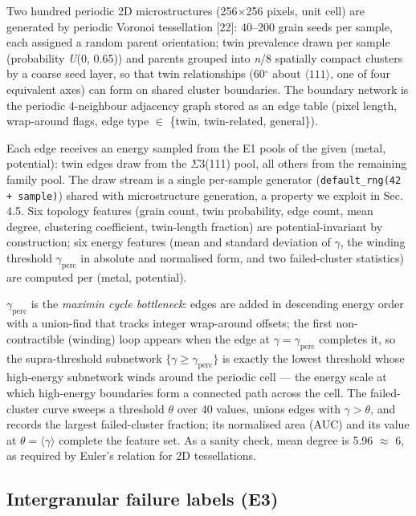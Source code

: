 \documentclass[preprint,12pt]{elsarticle}
\begin{document}
Two hundred periodic 2D microstructures (256$\times$256 pixels, unit cell) are generated by periodic Voronoi tessellation [22]: 40--200 grain seeds per sample, each assigned a random parent orientation; twin prevalence drawn per sample (probability \textit{U}(0, 0.65)) and parents grouped into \textit{n}/8 spatially compact clusters by a coarse seed layer, so that twin relationships (60$^\circ$ about $\langle 111\rangle$, one of four equivalent axes) can form on shared cluster boundaries. The boundary network is the periodic 4-neighbour adjacency graph stored as an edge table (pixel length, wrap-around flags, edge type $\in$ \{twin, twin-related, general\}).

Each edge receives an energy sampled from the E1 pools of the given (metal, potential): twin edges draw from the $\Sigma$3(111) pool, all others from the remaining family pool. The draw stream is a single per-sample generator (\texttt{default\_rng(42 + sample)}) shared with microstructure generation, a property we exploit in Sec. 4.5. Six topology features (grain count, twin probability, edge count, mean degree, clustering coefficient, twin-length fraction) are potential-invariant by construction; six energy features (mean and standard deviation of $\gamma$, the winding threshold $\gamma_{\mathrm{perc}}$ in absolute and normalised form, and two failed-cluster statistics) are computed per (metal, potential).

$\gamma_{\mathrm{perc}}$ is the \textit{maximin cycle bottleneck}: edges are added in descending energy order with a union-find that tracks integer wrap-around offsets; the first non-contractible (winding) loop appears when the edge at $\gamma = \gamma_{\mathrm{perc}}$ completes it, so the supra-threshold subnetwork $\{\gamma \ge \gamma_{\mathrm{perc}}\}$ is exactly the lowest threshold whose high-energy subnetwork winds around the periodic cell --- the energy scale at which high-energy boundaries form a connected path across the cell. The failed-cluster curve sweeps a threshold $\theta$ over 40 values, unions edges with $\gamma > \theta$, and records the largest failed-cluster fraction; its normalised area (AUC) and its value at $\theta = \langle\gamma\rangle$ complete the feature set. As a sanity check, mean degree is 5.96 $\approx$ 6, as required by Euler's relation for 2D tessellations.

\subsection{Intergranular failure labels (E3)}
\end{document}
